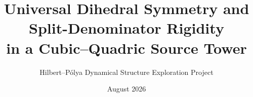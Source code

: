 \documentclass[11pt]{article}
\title{Universal Dihedral Symmetry and Split-Denominator Rigidity\\
in a Cubic--Quadric Source Tower}
\author{Hilbert--P\'olya Dynamical Structure Exploration Project}
\date{August 2026}
\theoremstyle{definition}
\theoremstyle{remark}
\begin{document}
\maketitle











\appendix



\begingroup
\raggedright


\endgroup
\end{document}
